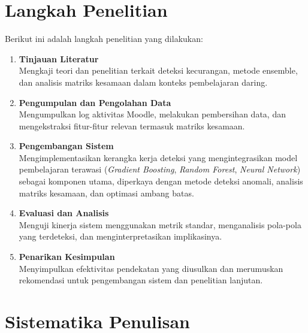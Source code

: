 \section{Langkah Penelitian}
\label{sec:langkahPenelitian}

Berikut ini adalah langkah penelitian yang dilakukan:

\begin{enumerate}
\item \textbf{Tinjauan Literatur}\\
Mengkaji teori dan penelitian terkait deteksi kecurangan, metode ensemble, dan analisis matriks kesamaan dalam konteks pembelajaran daring.

\item \textbf{Pengumpulan dan Pengolahan Data}\\
Mengumpulkan log aktivitas Moodle, melakukan pembersihan data, dan mengekstraksi fitur-fitur relevan termasuk matriks kesamaan.

\item \textbf{Pengembangan Sistem}\\
Mengimplementasikan kerangka kerja deteksi yang mengintegrasikan model pembelajaran terawasi (\textit{Gradient Boosting}, \textit{Random Forest}, \textit{Neural Network}) sebagai komponen utama, diperkaya dengan metode deteksi anomali, analisis matriks kesamaan, dan optimasi ambang batas.

\item \textbf{Evaluasi dan Analisis}\\
Menguji kinerja sistem menggunakan metrik standar, menganalisis pola-pola yang terdeteksi, dan menginterpretasikan implikasinya.

\item \textbf{Penarikan Kesimpulan}\\
Menyimpulkan efektivitas pendekatan yang diusulkan dan merumuskan rekomendasi untuk pengembangan sistem dan penelitian lanjutan.
\end{enumerate}

\section{Sistematika Penulisan}
\label{sec:sistematikaPenulisan}

